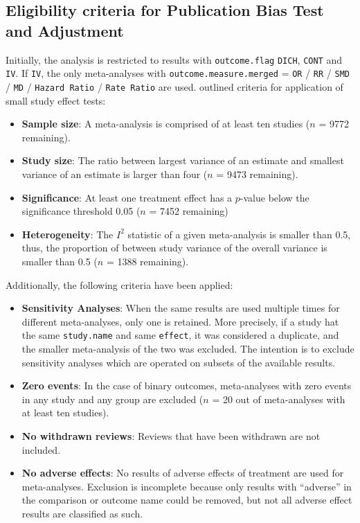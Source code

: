 \documentclass[11pt,a4paper,twoside]{book}\usepackage[]{graphicx}\usepackage[]{color}
\begin{document}
\subsection{Eligibility criteria for Publication Bias Test and Adjustment} 

Initially, the analysis is restricted to results with \texttt{outcome.flag} \texttt{DICH}, \texttt{CONT} and \texttt{IV}. If \texttt{IV}, the only meta-analyses with \texttt{outcome.measure.merged} = \texttt{OR} / \texttt{RR} / \texttt{SMD} / \texttt{MD} / \texttt{Hazard Ratio} / \texttt{Rate Ratio} are used. 
\citet{Ioannidis2007} outlined criteria for application of small study effect tests:
\begin{itemize}
\item \textbf{Sample size}: A meta-analysis is comprised of at least ten studies ($n$ = 9772 remaining). 
\item \textbf{Study size}: The ratio between largest variance of an estimate and smallest variance of an estimate is larger than four ($n$ = 9473 remaining).
\item \textbf{Significance}: At least one treatment effect has a $p$-value below the significance threshold 0.05 ($n$ = 7452 remaining)
\item \textbf{Heterogeneity}: The $I^2$ statistic of a given meta-analysis is smaller than 0.5, thus, the proportion of between study variance of the overall variance is smaller than 0.5 ($n$ = 1388 remaining).
\end{itemize}
Additionally, the following criteria have been applied:
\begin{itemize}
\item \textbf{Sensitivity Analyses}: When the same results are used multiple times for different meta-analyses, only one is retained. More precisely, if a study hat the same \texttt{study.name} and same \texttt{effect}, it was considered a duplicate, and the smaller meta-analysis of the two was excluded. The intention is to exclude sensitivity analyses which are operated on subsets of the available results.
\item \textbf{Zero events}: In the case of binary outcomes, meta-analyses with zero events in any study and any group are excluded ($n$ = 20 out of meta-analyses with at least ten studies).
\item \textbf{No withdrawn reviews}: Reviews that have been withdrawn are not included.
\item \textbf{No adverse effects}: No results of adverse effects of treatment are used for meta-analyses. Exclusion is incomplete because only results with ``adverse'' in the comparison or outcome name could be removed, but not all adverse effect results are classified as such.
\end{itemize}
\end{document}
